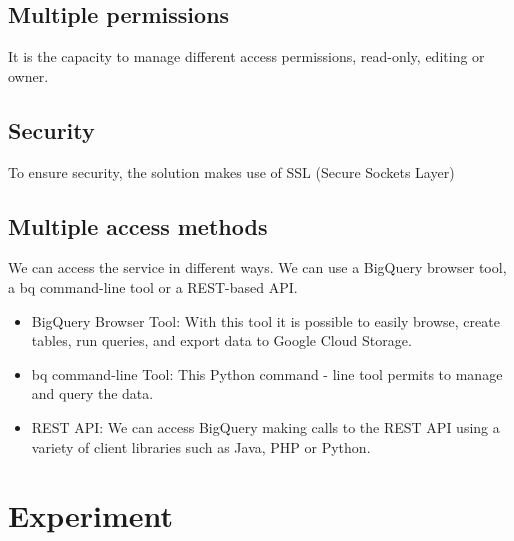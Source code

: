 \documentclass[9pt,twocolumn,twoside]{../../styles/osajnl}
\begin{document}
\subsection{Multiple permissions}
It is the capacity to manage different access permissions, read-only,
editing or owner.

\subsection{Security}
To ensure security, the solution makes use of SSL (Secure Sockets Layer)

\subsection{Multiple access methods}
We can access the service in different ways. We can use a BigQuery
browser tool, a bq command-line tool or a REST-based
API. \begin{itemize}
\item BigQuery Browser Tool: With this tool it is possible to easily browse,
create tables, run queries, and export data to Google Cloud Storage.
\item bq command-line Tool: This Python command - line tool permits to
  manage and query the data. \item REST API: We can access BigQuery
  making calls to the REST API using a variety of client libraries
  such as Java, PHP or Python.  \end{itemize}


\section{Experiment}
\end{document}
